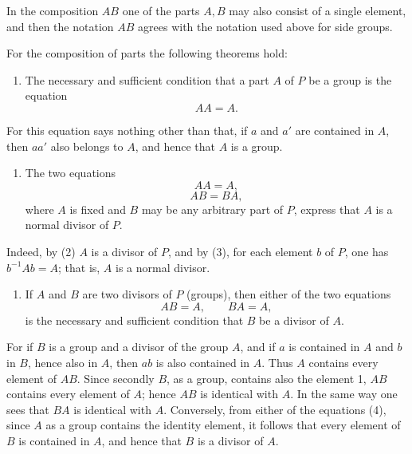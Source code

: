 \documentclass[11pt]{article}
\begin{document}
In the composition $AB$ one of the parts $A,B$ may also consist of a single element, and then the notation $AB$ agrees with the notation used above for side groups.

For the composition of parts the following theorems hold:

\begin{enumerate}[label=\arabic*.]
\item The necessary and sufficient condition that a part $A$ of $P$ be a group is the equation
\begin{equation}
AA=A.
\tag{1}
\end{equation}
\end{enumerate}
For this equation says nothing other than that, if $a$ and $a'$ are contained in $A$, then $aa'$ also belongs to $A$, and hence that $A$ is a group.

\begin{enumerate}[resume,label=\arabic*.]
\item The two equations
\begin{equation}
AA=A,
\tag{2}
\end{equation}
\begin{equation}
AB=BA,
\tag{3}
\end{equation}
where $A$ is fixed and $B$ may be any arbitrary part of $P$, express that $A$ is a normal divisor of $P$.
\end{enumerate}
Indeed, by (2) $A$ is a divisor of $P$, and by (3), for each element $b$ of $P$, one has $b^{-1}Ab=A$; that is, $A$ is a normal divisor.

\begin{enumerate}[resume,label=\arabic*.]
\item If $A$ and $B$ are two divisors of $P$ (groups), then either of the two equations
\begin{equation}
AB=A,
\qquad BA=A,
\tag{4}
\end{equation}
is the necessary and sufficient condition that $B$ be a divisor of $A$.
\end{enumerate}
For if $B$ is a group and a divisor of the group $A$, and if $a$ is contained in $A$ and $b$ in $B$, hence also in $A$, then $ab$ is also contained in $A$. Thus $A$ contains every element of $AB$. Since secondly $B$, as a group, contains also the element 1, $AB$ contains every element of $A$; hence $AB$ is identical with $A$. In the same way one sees that $BA$ is identical with $A$. Conversely, from either of the equations (4), since $A$ as a group contains the identity element, it follows that every element of $B$ is contained in $A$, and hence that $B$ is a divisor of $A$.
\end{document}
